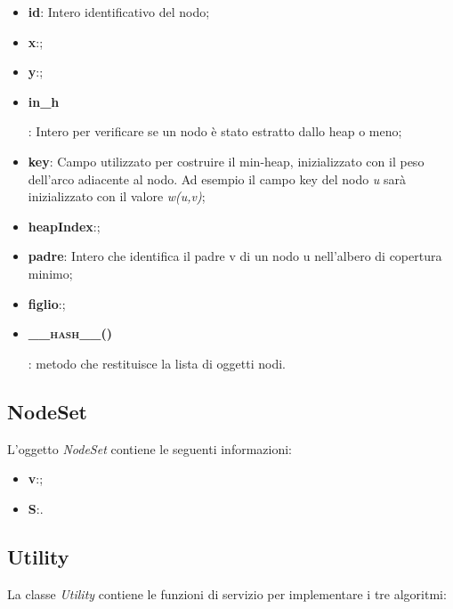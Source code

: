 \begin{itemize}
    \item \textbf{id}: Intero identificativo del nodo;
    \item \textbf{x}:;
    \item \textbf{y}:;
    \item \hypertarget{inh}{\textbf{in\_h}}: Intero per verificare se un nodo è stato estratto dallo heap o meno;
    \item \textbf{key}: Campo utilizzato per costruire il min-heap, inizializzato con il peso dell'arco adiacente al nodo. Ad esempio il campo key del nodo \emph{u} sarà inizializzato con il valore \emph{w(u,v)};
    \item \textbf{heapIndex}:;
    \item \textbf{padre}: Intero che identifica il padre v di un nodo u nell'albero di copertura minimo;
    \item \textbf{figlio}:;
    \item \hypertarget{hash}{\textbf{\textsc{\_\_hash\_\_()}}}: metodo che restituisce la lista di  oggetti nodi.
\end{itemize}


\subsection{NodeSet}
\label{nodeset}

L'oggetto \textit{NodeSet} contiene le seguenti informazioni:

\begin{itemize}
    \item \textbf{v}:;
    \item \textbf{S}:.
\end{itemize}


\subsection{Utility}
\label{utility}

La classe \textit{Utility} contiene le funzioni di servizio per implementare i tre algoritmi:


